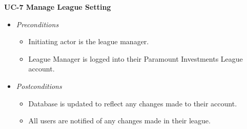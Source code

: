 \textbf{UC-7 Manage League Setting}
\begin{itemize}
	\item \emph{Preconditions}
		\begin{itemize}
\item Initiating actor is the league manager. 
\item League Manager is logged into their Paramount Investments League account.
		\end{itemize}
	\item \emph{Postconditions}
		\begin{itemize}

\item Database is updated to reflect any changes  made to their account.
\item All users are notified of any changes made in their league. 
		\end{itemize}
\end{itemize}
